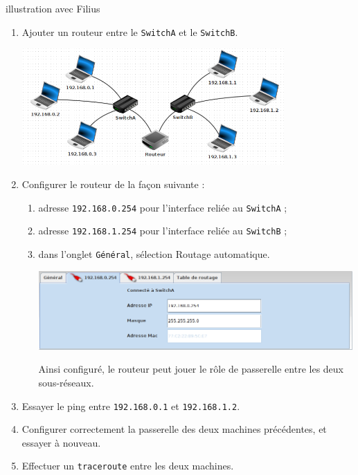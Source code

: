 \documentclass[a4paper,dvipsnames]{article}
\begin{document}
\medskip

\begin{activite}[breakable]{illustration avec Filius}{}
  \begin{enumerate}
    \item Ajouter un routeur entre le \texttt{SwitchA} et le \texttt{SwitchB}.
      \begin{center}
	\includegraphics[width=10cm]{img/f5.png}
      \end{center}
    \item Configurer le routeur de la façon suivante :
      \begin{enumerate}
	\item adresse \texttt{192.168.0.254} pour l'interface reliée au \texttt{SwitchA} ;
	\item adresse \texttt{192.168.1.254} pour l'interface reliée au \texttt{SwitchB} ;
	\item dans l'onglet \verb|Général|, sélection \og{}Routage automatique\fg{}.
	  \begin{center}
	    \includegraphics[width=12cm]{img/flsrouteur.png}
	\end{center} 
	Ainsi configuré, le routeur peut jouer le rôle de passerelle entre les deux sous-réseaux.
    \end{enumerate}
  \item Essayer le ping entre \texttt{192.168.0.1} et \texttt{192.168.1.2}.
  \item Configurer correctement la passerelle des deux machines précédentes, et essayer à nouveau.
  \item Effectuer un \texttt{traceroute} entre les deux machines.
  \end{enumerate}
\end{activite}
\end{document}
